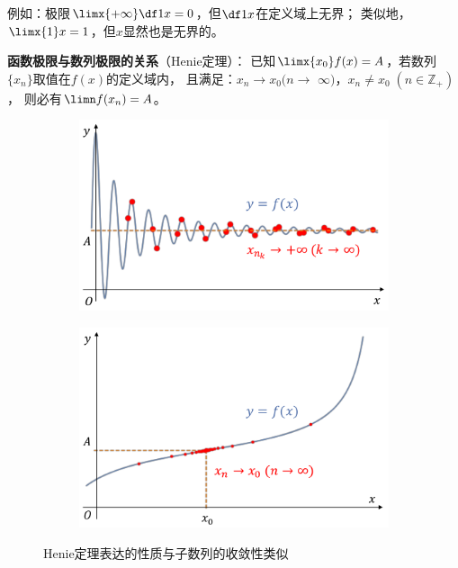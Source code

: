 例如：极限$\limx{+\infty}\df1x=0$，但$\df1x$在定义域上无界；
类似地，$\limx{1}x=1$，但$x$显然也是无界的。

\bs
{} 
\begin{thx}
	{\bf 函数极限与数列极限的关系}（{\kaishu Henie定理}）：
	已知$\limx{x_0}f(x)=A$，若数列$\{x_n\}$取值在$f(x)$的定义域内，
	且满足：$x_n\to x_0(n\to$ $\infty)$，$x_n\ne x_0\;
	(n\in\mathbb{Z}_+)$，
	则必有$\limn f(x_n)=A$。
\end{thx}

\begin{figure}[h]
	\centering
	\begin{subfigure}[t]{0.45\textwidth}
		\centering
		\includegraphics[width=\textwidth]{./Images/Ch01/HenieXnInf.pdf}
	\end{subfigure}
	\begin{subfigure}[t]{0.45\textwidth}
		\centering
		\includegraphics[width=\textwidth]{./Images/Ch01/HenieXnX0.pdf}
	\end{subfigure}
	\caption{Henie定理表达的性质与子数列的收敛性类似}
	\label{fig:Henie}
\end{figure}

